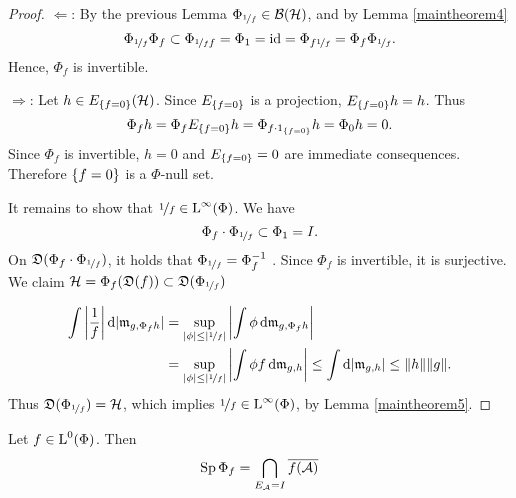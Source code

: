 \begin{proof}
 $\Leftarrow$:
 By the previous Lemma $\Phi_{\nicefrac{1}{f}} \in \mathcal{B}(\mathcal{H})$, and by Lemma 
 \ref{maintheorem4}
 \[
 \Phi_{\nicefrac{1}{f}} \Phi_f \subset \Phi_{\nicefrac{1}{f} f} = \Phi_1 = \operatorname{id} =
 \Phi_{f \nicefrac{1}{f}} = \Phi_f \Phi_{\nicefrac{1}{f}}.
 \]
Hence, $\Phi_f$ is invertible.

$\Rightarrow$:
Let $h \in E_{\left\lbrace f = 0\right\rbrace}(\mathcal{H})$. Since $E_{\left\lbrace f = 0\right\rbrace}$ is a
projection, $E_{\left\lbrace f = 0\right\rbrace} h = h$. Thus
\[
  \Phi_f h = \Phi_f E_{\left\lbrace f = 0\right\rbrace} h = \Phi_{f \cdot 
    1_{\left\lbrace f = 0\right\rbrace}} h = \Phi_0 h = 0.
\]
Since $\Phi_f $ is invertible, $h =0$ and $E_{\left\lbrace f = 0\right\rbrace} =0$ are
immediate consequences. Therefore $\left\lbrace f = 0\right\rbrace$ is a $\Phi$-null set. 

It remains to show that $ \nicefrac{1}{f} \in {\text{L}^\infty }(\Phi)$. We have
\[
\Phi_f \cdot \Phi_{\nicefrac{1}{f}} \subset \Phi_1 = I.
\]
On $\mathfrak{D}(\Phi_f \cdot \Phi_{\nicefrac{1}{f}}) $, it holds that 
$\Phi_{\nicefrac{1}{f}}= \Phi_f ^{-1}$ .
Since $\Phi_f$ is invertible, it is surjective. We claim $ \mathcal{H} = \Phi_f(\mathfrak{D}(f))
\subset \mathfrak{D}(\Phi_{\nicefrac{1}{f}})$

\begin{align*}
  \int \left| \frac{1}{f} \right | \text{d}|\mathfrak{m}_{g,\Phi_f h}| &= \sup_{| \phi |
    \leq \left | \nicefrac{1}{f} \right| } \left | \int \phi \operatorname{d}\! \mathfrak{m}_{g,\Phi_f h}
  \right| \\&= \sup_{| \phi | \leq \left| \nicefrac{1}{f} \right |}
  \left| \int \phi f \operatorname{d}\! \mathfrak{m}_{g,h} \right| \leq \int \text{d}|\mathfrak{m}_{g,h}| \leq
  \| h \| \|g\|.
\end{align*}
Thus $\mathfrak{D}(\Phi_{\nicefrac{1}{f}}) = \mathcal{H}$, which implies $\nicefrac{1}{f}
\in {\text{L}^\infty }(\Phi)$,
by Lemma \ref{maintheorem5}.
\end{proof}

\begin{lem} \label{maintheorem7}
 Let $f \in {\text{L}^0}(\Phi)$. Then 
 \[
 \operatorname{Sp} \Phi_f = \bigcap_{E_\mathcal{A} = I} \overline{f(\mathcal{A})}
 \]

\end{lem}

